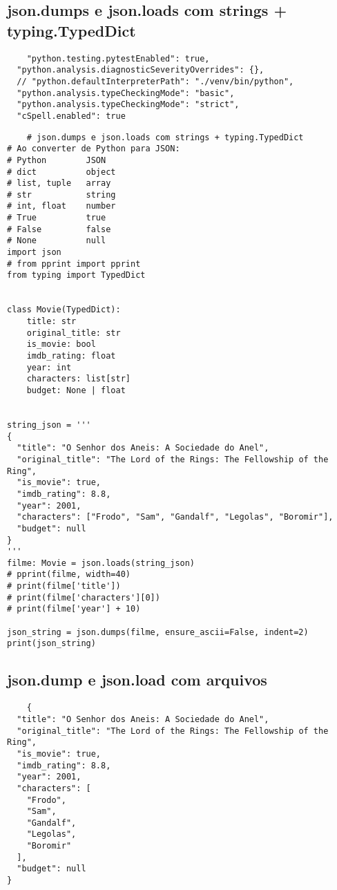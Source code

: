 \documentclass{article}
\begin{document}
\subsection{json.dumps e json.loads com strings + typing.TypedDict}
\begin{lstlisting}
    "python.testing.pytestEnabled": true,
  "python.analysis.diagnosticSeverityOverrides": {},
  // "python.defaultInterpreterPath": "./venv/bin/python",
  "python.analysis.typeCheckingMode": "basic",
  "python.analysis.typeCheckingMode": "strict",
  "cSpell.enabled": true

\end{lstlisting}
\begin{lstlisting}
    # json.dumps e json.loads com strings + typing.TypedDict
# Ao converter de Python para JSON:
# Python        JSON
# dict          object
# list, tuple   array
# str           string
# int, float    number
# True          true
# False         false
# None          null
import json
# from pprint import pprint
from typing import TypedDict


class Movie(TypedDict):
    title: str
    original_title: str
    is_movie: bool
    imdb_rating: float
    year: int
    characters: list[str]
    budget: None | float


string_json = '''
{
  "title": "O Senhor dos Aneis: A Sociedade do Anel",
  "original_title": "The Lord of the Rings: The Fellowship of the Ring",
  "is_movie": true,
  "imdb_rating": 8.8,
  "year": 2001,
  "characters": ["Frodo", "Sam", "Gandalf", "Legolas", "Boromir"],
  "budget": null
}
'''
filme: Movie = json.loads(string_json)
# pprint(filme, width=40)
# print(filme['title'])
# print(filme['characters'][0])
# print(filme['year'] + 10)

json_string = json.dumps(filme, ensure_ascii=False, indent=2)
print(json_string)
\end{lstlisting}

\subsection{json.dump e json.load com arquivos}
\begin{lstlisting}
    {
  "title": "O Senhor dos Aneis: A Sociedade do Anel",
  "original_title": "The Lord of the Rings: The Fellowship of the Ring",
  "is_movie": true,
  "imdb_rating": 8.8,
  "year": 2001,
  "characters": [
    "Frodo",
    "Sam",
    "Gandalf",
    "Legolas",
    "Boromir"
  ],
  "budget": null
}
\end{lstlisting}
\end{document}
